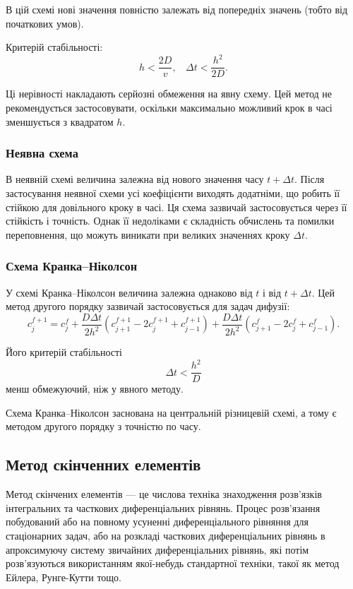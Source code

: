 \documentclass{diploma}
\begin{document}
В цій схемі нові значення повністю залежать від попередніх значень (тобто від початкових умов).

Критерій стабільності:
\begin{equation} \label{eq:ExplicitSchemeStability}
	h < \frac{2D}{v}, ~~~~ \Delta t < \frac{h^2}{2D}.
\end{equation}

Ці нерівності накладають серйозні обмеження на явну схему. Цей метод не рекомендується застосовувати, оскільки максимально можливий крок в часі зменшується з квадратом $h$.

\subsubsection{Неявна схема}
В неявній схемі величина залежна від нового значення часу $t+\Delta t$. Після застосування неявної схеми усі коефіцієнти виходять додатніми, що робить її стійкою для довільного кроку в часі. Ця схема зазвичай застосовується через її стійкість і точність. Однак її недоліками є складність обчислень та помилки переповнення, що можуть виникати при великих значеннях кроку $\Delta t$.

\subsubsection{Схема Кранка--Ніколсон}
У схемі Кранка--Ніколсон величина залежна однаково від $t$ і від $t+\Delta t$. Цей метод другого порядку зазвичай застосовується для задач дифузії:
\begin{equation} \label{eq:CrankNikolsonScheme}
		c^{f+1}_j = c^{f}_j + \frac{D\Delta t}{2h^2} (c^{f+1}_{j+1} - 2c^{f+1}_{j} + c^{f+1}_{j-1})	+ \frac{D\Delta t}{2h^2} (c^{f}_{j+1} - 2c^{f}_{j} + c^{f}_{j-1}).
\end{equation}

Його критерій стабільності
\begin{equation} \label{eq:CrankNikolsonStability}
	\Delta t < \frac{h^2}{D}
\end{equation}
менш обмежуючий, ніж у явного методу.

Схема Кранка--Ніколсон заснована на центральній різницевій схемі, а тому є методом другого порядку з точністю по часу.

\subsection{Метод скінченних елементів}
Метод скінчених елементів --- це числова техніка знаходження розв'язків інтегральних та часткових диференціальних рівнянь. Процес розв'язання побудований або на повному усуненні диференціального рівняння для стаціонарних задач, або на розкладі часткових диференціальних рівнянь в апроксимуючу систему звичайних диференціальних рівнянь, які потім розв'язуються використанням якої-небудь стандартної техніки, такої як метод Ейлера, Рунге-Кутти тощо.
\end{document}
